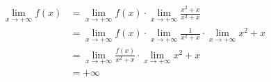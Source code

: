 \documentclass[12pt]{article}
\begin{document}
\subsection{}
\begin{align*}
    \lim_{x\rightarrow +\infty} f(x)
    &= \lim_{x\rightarrow +\infty} f(x) \cdot \lim_{x\rightarrow +\infty} \frac{x^2+x}{x^2+x} \\
    &= \lim_{x\rightarrow +\infty} f(x) \cdot \lim_{x\rightarrow +\infty} \frac{1}{x^2+x} \cdot \lim_{x\rightarrow +\infty} x^2+x \\
    &= \lim_{x\rightarrow +\infty} \frac{f(x)}{x^2+x} \cdot \lim_{x\rightarrow +\infty} x^2+x \\
    &= +\infty
\end{align*}
\end{document}
